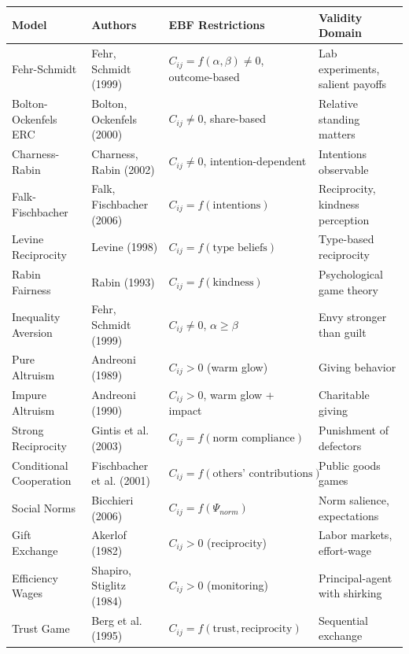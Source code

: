 \small
\begin{longtable}{@{}p{3cm}p{2.5cm}p{4cm}p{4cm}@{}}
\toprule
\textbf{Model} & \textbf{Authors} & \textbf{EBF Restrictions} & \textbf{Validity Domain} \\
\midrule
\endhead

Fehr-Schmidt & Fehr, Schmidt (1999) &
$C_{ij}=f(\alpha,\beta) \neq 0$, outcome-based &
Lab experiments, salient payoffs \\

Bolton-Ockenfels ERC & Bolton, Ockenfels (2000) &
$C_{ij} \neq 0$, share-based &
Relative standing matters \\

Charness-Rabin & Charness, Rabin (2002) &
$C_{ij} \neq 0$, intention-dependent &
Intentions observable \\

Falk-Fischbacher & Falk, Fischbacher (2006) &
$C_{ij}=f(\text{intentions})$ &
Reciprocity, kindness perception \\

Levine Reciprocity & Levine (1998) &
$C_{ij}=f(\text{type beliefs})$ &
Type-based reciprocity \\

Rabin Fairness & Rabin (1993) &
$C_{ij}=f(\text{kindness})$ &
Psychological game theory \\

Inequality Aversion & Fehr, Schmidt (1999) &
$C_{ij} \neq 0$, $\alpha \geq \beta$ &
Envy stronger than guilt \\

Pure Altruism & Andreoni (1989) &
$C_{ij} > 0$ (warm glow) &
Giving behavior \\

Impure Altruism & Andreoni (1990) &
$C_{ij} > 0$, warm glow + impact &
Charitable giving \\

Strong Reciprocity & Gintis et al. (2003) &
$C_{ij} = f(\text{norm compliance})$ &
Punishment of defectors \\

Conditional Cooperation & Fischbacher et al. (2001) &
$C_{ij} = f(\text{others' contributions})$ &
Public goods games \\

Social Norms & Bicchieri (2006) &
$C_{ij} = f(\Psi_{norm})$ &
Norm salience, expectations \\

Gift Exchange & Akerlof (1982) &
$C_{ij} > 0$ (reciprocity) &
Labor markets, effort-wage \\

Efficiency Wages & Shapiro, Stiglitz (1984) &
$C_{ij} > 0$ (monitoring) &
Principal-agent with shirking \\

Trust Game & Berg et al. (1995) &
$C_{ij} = f(\text{trust}, \text{reciprocity})$ &
Sequential exchange \\

\bottomrule
\end{longtable}
\normalsize

